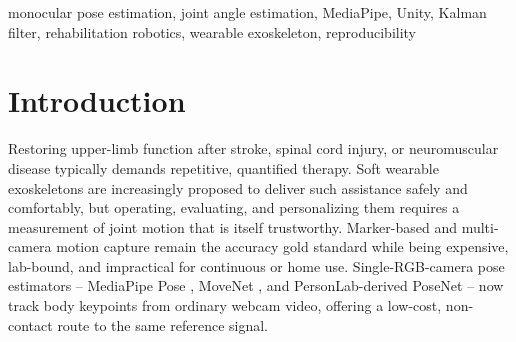 \documentclass[conference]{IEEEtran}
\begin{document}
\begin{abstract}
3D motion-capture ground truth on a CMU Panoptic Studio sequence.
Computed from MediaPipe's normalized image landmarks, the error is
strongly anisotropic: shoulder abduction, which the image plane carries,
attains $5$--$8^\circ$ MAE with Pearson $r\geq0.97$, while flexion,
axial rotation and elbow flexion carry $33$--$64^\circ$ of error, three
channels with negative correlation, for a macro-averaged MPJAE of
$36.4^\circ$. An input-space ablation shows that most of this failure is
an artifact of that input rather than of monocular sensing: applying the
identical decomposition to the same network's metric world landmarks
halves MPJAE to $18.3^\circ$ and moves both elbows from $r=-0.23$ and
$-0.85$ to $r=0.96$, whereas correcting the image aspect ratio alone does
not help. Flexion near the decomposition's singularity at $90^\circ$
abduction and left axial rotation remain unreliable, so the pipeline is a
usable source of abduction and elbow flexion for avatar control and
coarse range-of-motion tracking, but not yet the axial-rotation reference
a wearable exoskeleton would demand. We additionally document two classes
of integration error the evaluation exposed: an avatar control path that
silently inverted two degrees of freedom while every upstream component
tested correct, and a torso frame built with a right-handed cross product
inside a left-handed engine, which mirrored the avatar's sagittal plane
while a self-consistent round trip reported zero error.
\end{abstract}

\begin{IEEEkeywords}
monocular pose estimation, joint angle estimation, MediaPipe, Unity,
Kalman filter, rehabilitation robotics, wearable exoskeleton,
reproducibility
\end{IEEEkeywords}

\section{Introduction}

Restoring upper-limb function after stroke, spinal cord injury, or
neuromuscular disease typically demands repetitive, quantified therapy.
Soft wearable exoskeletons are increasingly proposed to deliver such
assistance safely and comfortably, but operating, evaluating, and
personalizing them requires a measurement of joint motion that is itself
trustworthy. Marker-based and multi-camera motion capture remain the
accuracy gold standard while being expensive, lab-bound, and impractical
for continuous or home use. Single-RGB-camera pose estimators --
MediaPipe Pose \cite{bazarevsky2020blazepose}, MoveNet
\cite{movenet2021blog}, and PersonLab-derived PoseNet
\cite{papandreou2018personlab} -- now track body keypoints from ordinary
webcam video, offering a low-cost, non-contact route to the same
reference signal.
\end{document}
